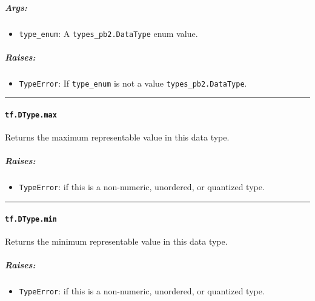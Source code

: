 \subparagraph{Args: }\label{args-19}

\begin{itemize}
\tightlist
\item
  \lstinline{type_enum}: A \lstinline{types_pb2.DataType} enum value.
\end{itemize}

\subparagraph{Raises: }\label{raises-10}

\begin{itemize}
\tightlist
\item
  \lstinline{TypeError}: If \lstinline{type_enum} is not a value
  \lstinline{types_pb2.DataType}.
\end{itemize}

\begin{center}\rule{0.5\linewidth}{\linethickness}\end{center}

\paragraph{\texorpdfstring{\lstinline{tf.DType.max}
}{tf.DType.max }}\label{tf.dtype.max}

Returns the maximum representable value in this data type.

\subparagraph{Raises: }\label{raises-11}

\begin{itemize}
\tightlist
\item
  \lstinline{TypeError}: if this is a non-numeric, unordered, or quantized
  type.
\end{itemize}

\begin{center}\rule{0.5\linewidth}{\linethickness}\end{center}

\paragraph{\texorpdfstring{\lstinline{tf.DType.min}
}{tf.DType.min }}\label{tf.dtype.min}

Returns the minimum representable value in this data type.

\subparagraph{Raises: }\label{raises-12}

\begin{itemize}
\tightlist
\item
  \lstinline{TypeError}: if this is a non-numeric, unordered, or quantized
  type.
\end{itemize}

